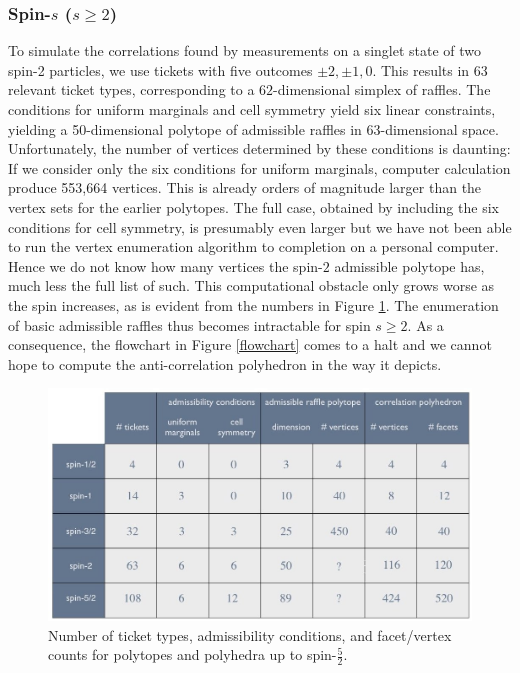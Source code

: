 
\subsubsection{Spin-$s$ ($s \ge 2$)}  \label{2.2.4}

To simulate the correlations found by measurements on a singlet state of two spin-2 particles, we use  tickets with five outcomes $\pm 2,\pm 1,0$. This results in 63 relevant ticket types, corresponding to a $62$-dimensional simplex of raffles. The conditions for uniform marginals and cell symmetry yield six linear constraints, yielding a 50-dimensional polytope of admissible raffles in 63-dimensional space. Unfortunately, the number of vertices determined by these conditions is daunting: If we consider only the six conditions for uniform marginals, computer calculation produce 553,664 vertices. This is already orders of magnitude larger than the vertex sets for the earlier polytopes. The full case, obtained by including the six conditions for cell symmetry, is presumably even larger but we have not been able to run the vertex enumeration algorithm to completion on a personal computer. Hence we do not know how many vertices the spin-$2$ admissible polytope has, much less the full list of such. This computational obstacle only grows worse as the spin increases, as is evident from the numbers in Figure \ref{numberoftickets}. The enumeration of basic admissible raffles thus becomes intractable for spin $s\geq 2$. As a consequence, the flowchart in Figure \ref{flowchart} comes to a halt and we cannot hope to compute the anti-correlation polyhedron in the way it depicts.

\begin{figure}[h]
 \centering
   \includegraphics[width=5.5in]{numberoftickets.jpeg} 
   \caption{Number of ticket types, admissibility conditions, and facet/vertex counts for polytopes and polyhedra up to spin-$\frac52$.}
      \label{numberoftickets}
\end{figure}

